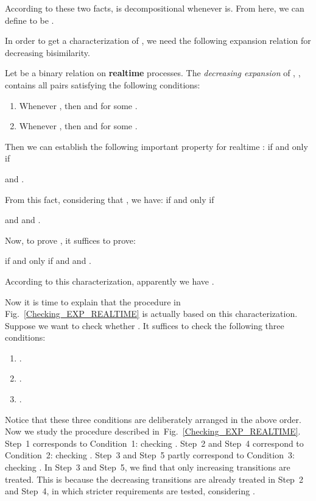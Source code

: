 \documentclass{llncs}
\begin{document}
According to these two facts,  is decompositional whenever  is.  From here, we can define  to be .

In order to get a characterization of , we need the following
 expansion relation for decreasing bisimilarity.

\begin{definition}
Let  be a binary relation on \textbf{realtime} processes. The {\em decreasing expansion} of ,  , contains all pairs
 satisfying the following conditions:
\begin{enumerate}
\item
Whenever , then
   and   for some .


\item
Whenever  , then
   and   for some .
\end{enumerate}
\end{definition}
Then
we can establish the following important property for realtime :
 if and only if
\begin{center}
 and .
\end{center}
From this fact, considering that , we have:
 if and only if
\begin{center}
 and
  and .
\end{center}
Now, to prove , it suffices to prove:
\begin{center}
 if and only if  and  and .
\end{center}

According to this characterization, apparently we have .


Now it is time to  explain that
 the procedure in Fig.~\ref{Checking_EXP_REALTIME} is actually based on this characterization.
Suppose we want to check whether .  It suffices to check the following three conditions:
\begin{enumerate}
\item
.

\item
.

\item
.
\end{enumerate}

Notice that these three conditions are deliberately arranged in the above order.
Now we study the procedure described in~Fig.~\ref{Checking_EXP_REALTIME}. Step~1 corresponds to Condition~1: checking . Step~2 and Step~4 correspond to Condition~2: checking . Step~3 and Step~5 partly  correspond to Condition~3: checking . In  Step~3 and Step~5, we find that only increasing transitions are treated. This is because the decreasing transitions are already treated in Step~2 and Step~4, in which stricter requirements are tested, considering  .
\end{document}
